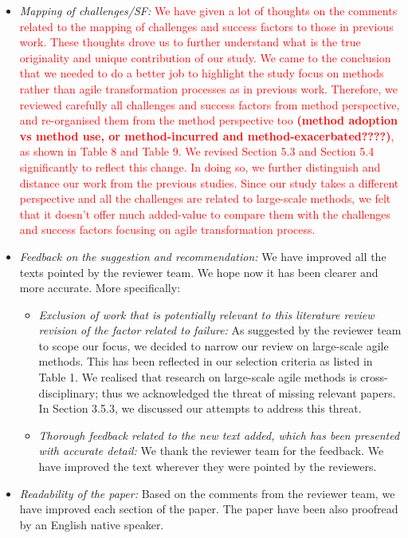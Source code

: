 \documentclass[a4paper,twoside,11pt]{reviewresponse}
\begin{document}
\begin{itemize}
	\item \textit{Mapping of challenges/SF:} \textcolor{red}{We have given a lot of thoughts on the comments related to the mapping of challenges and success factors to those in previous work. These thoughts drove us to further understand what is the true originality and unique contribution of our study. We came to the conclusion that we needed to do a better job to highlight the study focus on methods rather than agile transformation processes as in previous work. Therefore, we reviewed carefully all challenges and success factors from method perspective, and re-organised them from the method perspective too \textbf{(method adoption vs method use, or method-incurred and method-exacerbated????)}, as shown in Table 8 and Table 9. We revised Section 5.3 and Section 5.4 significantly to reflect this change. In doing so, we further distinguish and distance our work from the previous studies. Since our study takes a different perspective and all the challenges are related to large-scale methods, we felt that it doesn't offer much added-value to compare them with the challenges and success factors focusing on agile transformation process.}
	\item \textit{Feedback on the suggestion and recommendation:} We have improved all the texts pointed by the reviewer team. We hope now it has been clearer and more accurate. More specifically:
		\begin{itemize}
			\item \textit{Exclusion of work that is potentially relevant to this literature review revision of the factor related to failure:} As suggested by the reviewer team to scope our focus, we decided to narrow our review on large-scale agile methods. This has been reflected in our selection criteria as listed in Table 1. We realised that research on large-scale agile methods is cross-disciplinary; thus we acknowledged the threat of missing relevant papers. In Section 3.5.3, we discussed our attempts to address this threat.
			\item \textit{Thorough feedback related to the new text added, which has been presented with accurate detail:} We thank the reviewer team for the feedback. We have improved the text wherever they were pointed by the reviewers.
		\end{itemize}	
	\item \textit{Readability of the paper:} Based on the comments from the reviewer team, we have improved
each section of the paper. The paper have been also proofread by an English native speaker.
\end{itemize}
\end{document}
